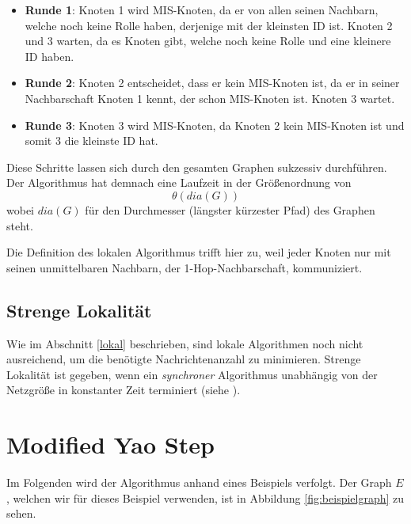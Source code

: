 \documentclass[a4paper,twoside]{IEEEtran}
\begin{document}
\begin{itemize}
\item \textbf{Runde 1}: Knoten 1 wird MIS-Knoten, da er von allen seinen Nachbarn, welche noch keine Rolle haben, derjenige mit der kleinsten ID ist. Knoten 2 und 3 warten, da es Knoten gibt, welche noch keine Rolle und eine kleinere ID haben.

\item \textbf{Runde 2}: Knoten 2 entscheidet, dass er kein MIS-Knoten ist, da er in seiner Nachbarschaft Knoten 1 kennt, der schon MIS-Knoten ist. Knoten 3 wartet.

\item \textbf{Runde 3}: Knoten 3 wird MIS-Knoten, da Knoten 2 kein MIS-Knoten ist und somit 3 die kleinste ID hat. 
\end{itemize}

Diese Schritte lassen sich durch den gesamten Graphen sukzessiv durchführen. 
Der Algorithmus hat demnach eine Laufzeit in der Größenordnung von 
\begin{equation*}
\theta (dia(G)) 
\end{equation*}
wobei $dia(G) $ für den Durchmesser (längster kürzester Pfad) des Graphen steht.

Die Definition des lokalen Algorithmus trifft hier zu, weil jeder Knoten nur mit seinen unmittelbaren Nachbarn, der 1-Hop-Nachbarschaft, kommuniziert.





\subsection{Strenge Lokalität}
Wie im Abschnitt \ref{lokal} beschrieben, sind lokale Algorithmen noch nicht ausreichend, um die benötigte Nachrichtenanzahl zu minimieren.
Strenge Lokalität ist gegeben, wenn ein \emph{synchroner} Algorithmus unabhängig von der Netzgröße in konstanter Zeit terminiert (siehe \cite{strictlyLocal}).



\section{Modified Yao Step}
Im Folgenden wird der Algorithmus anhand eines Beispiels verfolgt.
Der Graph $E $, welchen wir für dieses Beispiel verwenden, ist in Abbildung \ref{fig:beispielgraph} zu sehen.
\end{document}
